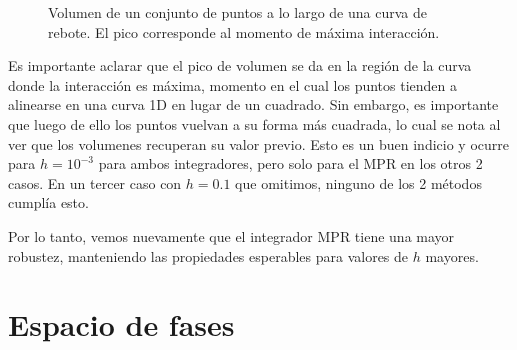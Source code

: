 \documentclass[twoside, 12pt]{article}
\begin{document}
\begin{figure}[h]
	\centering
	\caption{Volumen de un conjunto de puntos a lo largo de una curva de rebote. El pico corresponde al momento de máxima interacción.}
	\label{fig:vol_fas}
\end{figure}

Es importante aclarar que el pico de volumen se da en la región de la curva donde la interacción es máxima, momento en el cual los puntos tienden a alinearse en una curva 1D en lugar de un cuadrado.
Sin embargo, es importante que luego de ello los puntos vuelvan a su forma más cuadrada, lo cual se nota al ver que los volumenes recuperan su valor previo. 
Esto es un buen indicio y ocurre para $h=10^{-3}$ para ambos integradores, pero solo para el MPR en los otros 2 casos. 
En un tercer caso con $h=0.1$ que omitimos, ninguno de los 2 métodos cumplía esto.

Por lo tanto, vemos nuevamente que el integrador MPR tiene una mayor robustez, manteniendo las propiedades esperables para valores de $h$ mayores.


\section{Espacio de fases}
\end{document}
